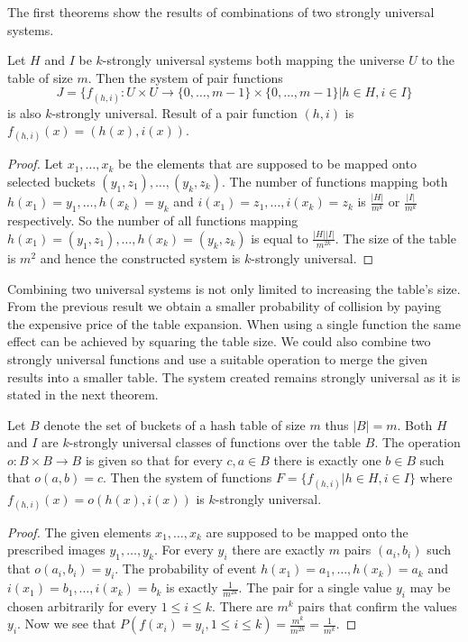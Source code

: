 The first theorems show the results of combinations of two strongly universal systems.
\begin{theorem}
Let $H$ and $I$ be $k$-strongly universal systems both mapping the universe $U$ to the table of size $m$. Then the system of pair functions 
\begin{displaymath}
J = \lbrace f_{(h, i)}:U \times U \rightarrow \lbrace 0, \dots, m - 1 \rbrace \times \lbrace 0, \dots, m - 1 \rbrace | h \in H, i \in I \rbrace
\end{displaymath} 
is also $k$-strongly universal. Result of a pair function $(h, i)$ is $f_{(h, i)}(x) = (h(x), i(x))$.
\end{theorem}
\begin{proof}
Let $x_1, \dots, x_k$ be the elements that are supposed to be mapped onto selected buckets $(y_1, z_1), \dots, (y_k, z_k)$. The number of functions mapping both $h(x_1) = y_1, \dots, h(x_k) = y_k$ and $i(x_1) = z_1, \dots, i(x_k) = z_k$ is $\frac{|H|}{m^k}$ or $\frac{|I|}{m^k}$ respectively. So the number of all functions mapping $h(x_1) = (y_1, z_1), \dots, h(x_k) = (y_k, z_k)$ is equal to $\frac{|H||I|}{m^{2k}}$. The size of the table is $m^2$ and hence the constructed system is $k$-strongly universal.
\end{proof}

Combining two universal systems is not only limited to increasing the table's size. From the previous result we obtain a smaller probability of collision by paying the expensive price of the table expansion. When using a single function the same effect can be achieved by squaring the table size.  We could also combine two strongly universal functions and use a suitable operation to merge the given results into a smaller table. The system created remains strongly universal as it is stated in the next theorem.

\begin{theorem}
Let $B$ denote the set of buckets of a hash table of size $m$ thus $|B| = m$. Both $H$ and $I$ are $k$-strongly universal classes of functions over the table $B$. The operation $o: B \times B \rightarrow B$ is given so that for every $c, a \in B$ there is exactly one $b \in B$ such that $o(a, b) = c$. Then the system of functions $F = \lbrace f_{(h, i)} | h \in H, i \in I \rbrace$ where $f_{(h, i)}(x) = o(h(x), i(x))$ is $k$-strongly universal.
\end{theorem}
\begin{proof}
The given elements $x_1, \dots, x_k$ are supposed to be mapped onto the prescribed images $y_1, \dots, y_k$. For every $y_i$ there are exactly $m$ pairs $(a_i, b_i)$ such that $o(a_i, b_i) = y_i$. The probability of event $h(x_1) = a_1, \dots, h(x_k) = a_k$ and $i(x_1) = b_1, \dots, i(x_k) = b_k$ is exactly $\frac{1}{m^{2k}}$. The pair for a single value $y_i$ may be chosen arbitrarily for every $1 \le i \le k$. There are $m^k$ pairs that confirm the values $y_i$. Now we see that $P(f(x_i) = y_i, 1 \le i \le k) = \frac{m^k}{m^{2k}} = \frac{1}{m^k}$.
\end{proof}

